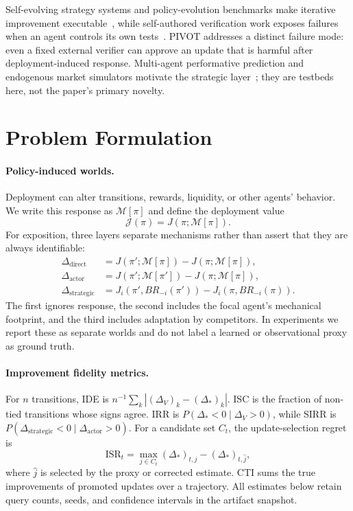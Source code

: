 \documentclass[10pt,twocolumn]{article}
\newcommand{\M}{\mathcal{M}}
\newcommand{\J}{\mathcal{J}}
\newcommand{\pii}{\pi}
\newcommand{\pip}{\pi'}
\newcommand{\dproxy}{\Delta_V}
\newcommand{\dtrue}{\Delta_*}
\begin{document}
Self-evolving strategy systems and policy-evolution benchmarks make iterative
improvement executable~\cite{evoquant2026,evopolicygym2026}, while
self-authored verification work exposes failures when an agent controls its
own tests~\cite{selfauthored2026}. PIVOT addresses a distinct failure mode:
even a fixed external verifier can approve an update that is harmful after
deployment-induced response. Multi-agent performative prediction and
endogenous market simulators motivate the strategic layer~\cite{map2025,abidesmarl2025};
they are testbeds here, not the paper's primary novelty.

\section{Problem Formulation}
\paragraph{Policy-induced worlds.}
Deployment can alter transitions, rewards, liquidity, or other agents'
behavior. We write this response as $\M[\pi]$ and define the deployment value
\begin{equation}
    \J(\pi)=J(\pi;\M[\pi]).
\end{equation}
For exposition, three layers separate mechanisms rather than assert that they
are always identifiable:
\begin{align}
 \Delta_{\mathrm{direct}} &= J(\pip;\M[\pii])-J(\pii;\M[\pii]),\\
 \Delta_{\mathrm{actor}} &= J(\pip;\M[\pip])-J(\pii;\M[\pii]),\\
 \Delta_{\mathrm{strategic}} &= J_i(\pip,BR_{-i}(\pip))
                              -J_i(\pii,BR_{-i}(\pii)).
\end{align}
The first ignores response, the second includes the focal agent's mechanical
footprint, and the third includes adaptation by competitors. In experiments we
report these as separate worlds and do not label a learned or observational
proxy as ground truth.

\paragraph{Improvement fidelity metrics.}
For $n$ transitions, IDE is
$n^{-1}\sum_k|(\dproxy)_k-(\dtrue)_k|$. ISC is the fraction of non-tied
transitions whose signs agree. IRR is
$P(\dtrue<0\mid\dproxy>0)$, while SIRR is
$P(\Delta_{\mathrm{strategic}}<0\mid\Delta_{\mathrm{actor}}>0)$.
For a candidate set $C_t$, the update-selection regret is
\begin{equation}
 \mathrm{ISR}_t=\max_{j\in C_t}(\dtrue)_{t,j}-(\dtrue)_{t,\hat j},
\end{equation}
where $\hat j$ is selected by the proxy or corrected estimate. CTI sums the
true improvements of promoted updates over a trajectory. All estimates below
retain query counts, seeds, and confidence intervals in the artifact snapshot.
\end{document}
